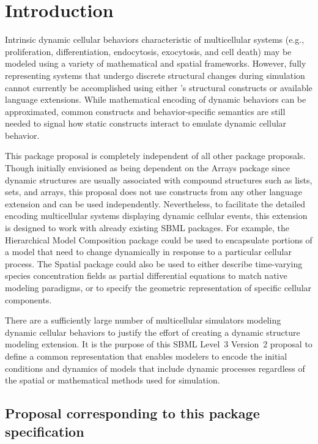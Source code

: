 
\section{Introduction}
\label{sec:intro}

Intrinsic dynamic cellular behaviors characteristic of multicellular systems (e.g., proliferation, differentiation, endocytosis, exocytosis, and cell death) may be modeled using a variety of mathematical and spatial frameworks. However, fully representing systems that undergo discrete structural changes during simulation cannot currently be accomplished using either \sbmlthreecore 's structural constructs or available language extensions. While mathematical encoding of dynamic behaviors can be approximated, common constructs and behavior-specific semantics are still needed to signal how static constructs interact to emulate dynamic cellular behavior.

This package proposal is completely independent of all other package proposals. Though initially envisioned as being dependent on the Arrays package since dynamic structures are usually associated with compound structures such as lists, sets, and arrays, this proposal does not use constructs from any other language extension and can be used independently. Nevertheless, to facilitate the detailed encoding multicellular systems displaying dynamic cellular events, this extension is designed to work with already existing SBML packages. For example, the Hierarchical Model Composition package could be used to encapsulate portions of a model that need to change dynamically in response to a particular cellular process. The Spatial package could also be used to either describe time-varying species concentration fields as partial differential equations to match native modeling paradigms, or to specify the geometric representation of specific cellular components.

There are a sufficiently large number of multicellular simulators modeling dynamic cellular behaviors to justify the effort of creating a dynamic structure modeling extension. It is the purpose of this SBML Level~3 Version~2 proposal to define a common representation that enables modelers to encode the initial conditions and dynamics of  models that include dynamic processes regardless of the spatial or mathematical methods used for simulation.  

\subsection{Proposal corresponding to this package specification}
\label{subsec:intro}

